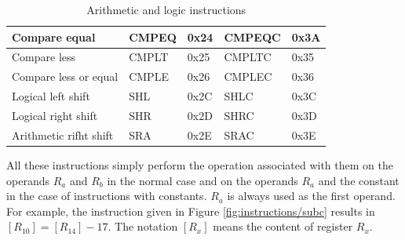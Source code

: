 \begin{table}[H]
\begin{tabular}{|l|l|l|l|l|}
    Compare equal                                               & CMPEQ                                                           & 0x24                                                         & CMPEQC                                                                & 0x3A                                                               \\ \hline
    Compare less                                                & CMPLT                                                           & 0x25                                                         & CMPLTC                                                                & 0x35                                                               \\ \hline
    Compare less or equal                                       & CMPLE                                                           & 0x26                                                         & CMPLEC                                                                & 0x36                                                               \\ \hline
    Logical left shift                                          & SHL                                                             & 0x2C                                                         & SHLC                                                                  & 0x3C                                                               \\ \hline
    Logical right shift                                         & SHR                                                             & 0x2D                                                         & SHRC                                                                  & 0x3D                                                               \\ \hline
    Arithmetic rifht shift                                      & SRA                                                             & 0x2E                                                         & SRAC                                                                  & 0x3E                                                               \\ \hline
    \end{tabular}
    \caption{Arithmetic and logic instructions}
    \label{tab:instruction/alu}
\end{table}

All these instructions simply perform the operation associated with them on the operands $R_a$ and 
$R_b$ in the normal case and on the operands $R_a$ and the constant in the case of instructions 
with constants. $R_a$ is always used as the first operand. For example, the instruction given 
in Figure \ref{fig:instructions/subc} results in $[R_{10}] = [R_{14}] - 17$. The notation 
$[R_x]$ means the content of register $R_x$.

